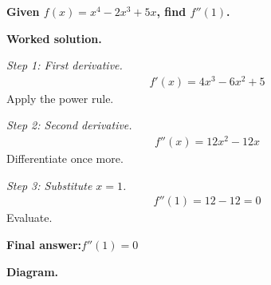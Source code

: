 \documentclass[11pt]{article}
\newcommand{\question}[1]{\par\medskip\noindent\textbf{#1}\par}
\begin{document}
\question{Given \( f(x) = x^4 - 2x^3 + 5x \), find \( f''(1) \).}

\textbf{Worked solution.}

\textit{Step 1: First derivative.}
\[\begin{gathered}
f'(x) = 4x^3 - 6x^2 + 5
\end{gathered}\]
Apply the power rule.

\textit{Step 2: Second derivative.}
\[\begin{gathered}
f''(x) = 12x^2 - 12x
\end{gathered}\]
Differentiate once more.

\textit{Step 3: Substitute \( x = 1 \).}
\[\begin{gathered}
f''(1) = 12 - 12 = 0
\end{gathered}\]
Evaluate.

\begin{answerbox}
\textbf{Final answer:}\quad \(\displaystyle  f''(1) = 0 \)
\end{answerbox}
\textbf{Diagram.}
\end{document}
